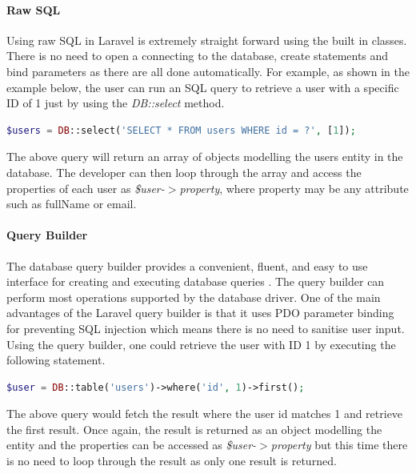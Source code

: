 \paragraph{Raw SQL}
Using raw SQL in Laravel is extremely straight forward using the built in classes. There is no need to open a connecting to the database, create statements and bind parameters as there are all done automatically. For example, as shown in the example below, the user can run an SQL query to retrieve a user with a specific ID of 1 just by using the \emph{DB::select} method.

\begin{lstlisting}[language=php]
	$users = DB::select('SELECT * FROM users WHERE id = ?', [1]);
\end{lstlisting}

The above query will return an array of objects modelling the users entity in the database. The developer can then loop through the array and access the properties of each user as \emph{\$user-$>$property}, where property may be any attribute such as fullName or email.

\paragraph{Query Builder}
The database query builder provides a convenient, fluent, and easy to use interface for creating and executing database queries \cite{Laravel:QueryBuilder}. The query builder can perform most operations supported by the database driver. One of the main advantages of the Laravel query builder is that it uses PDO parameter binding for preventing SQL injection which means there is no need to sanitise user input. Using the query builder, one could retrieve the user with ID 1 by executing the following statement.

\begin{lstlisting}[language=php]
	$user = DB::table('users')->where('id', 1)->first();
\end{lstlisting}

The above query would fetch the result where the user id matches 1 and retrieve the first result. Once again, the result is returned as an object modelling the entity and the properties can be accessed as \emph{\$user-$>$property} but this time there is no need to loop through the result as only one result is returned.

